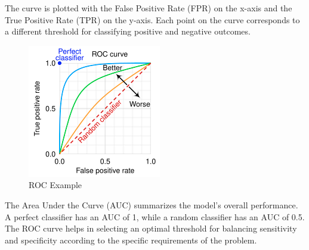 The curve is plotted with the False Positive Rate (FPR) on the x-axis and the True Positive Rate (TPR) on the y-axis. Each point on the curve corresponds to a different threshold for classifying positive and negative outcomes.

\begin{figure}[h!]
    \centering
    \includegraphics[width=0.75\linewidth]{images/roc.png}
    \caption{ROC Example}
    \label{fig:enter-label}
\end{figure}

The Area Under the Curve (AUC) summarizes the model's overall performance. A perfect classifier has an AUC of 1, while a random classifier has an AUC of 0.5. The ROC curve helps in selecting an optimal threshold for balancing sensitivity and specificity according to the specific requirements of the problem.

